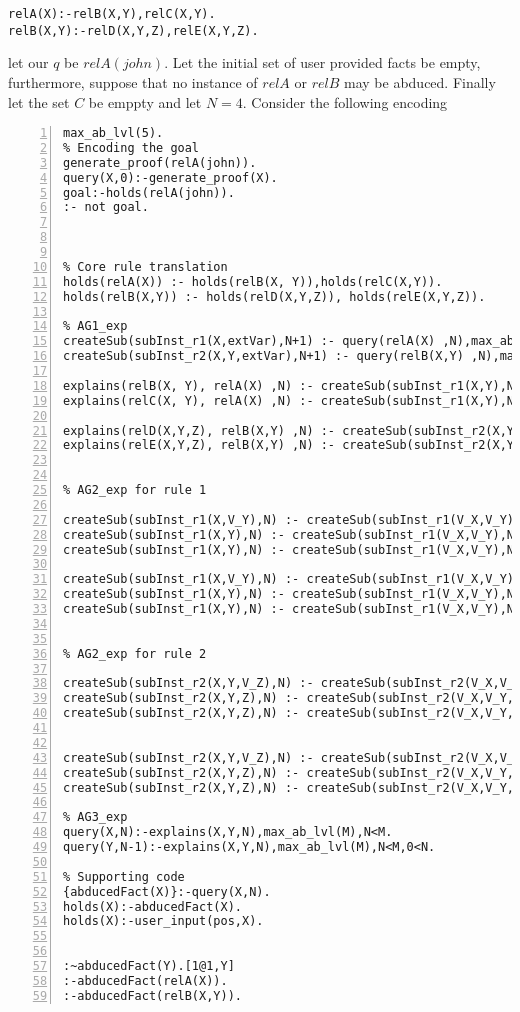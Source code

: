 \begin{lstlisting}[frame=none]
relA(X):-relB(X,Y),relC(X,Y).
relB(X,Y):-relD(X,Y,Z),relE(X,Y,Z).
\end{lstlisting}

let our $q$ be $relA(john)$. Let the initial set of user provided facts be empty, furthermore, suppose that no instance of $relA$ or $relB$ may be abduced. Finally let the set $C$ be emppty and let $N=4$.  
Consider the following encoding
\begin{lstlisting}[numbers=left]
max_ab_lvl(5).
% Encoding the goal
generate_proof(relA(john)).
query(X,0):-generate_proof(X).
goal:-holds(relA(john)).
:- not goal.



% Core rule translation
holds(relA(X)) :- holds(relB(X, Y)),holds(relC(X,Y)).
holds(relB(X,Y)) :- holds(relD(X,Y,Z)), holds(relE(X,Y,Z)).

% AG1_exp
createSub(subInst_r1(X,extVar),N+1) :- query(relA(X) ,N),max_ab_lvl(M),N<M-1.
createSub(subInst_r2(X,Y,extVar),N+1) :- query(relB(X,Y) ,N),max_ab_lvl(M),N<M-1.

explains(relB(X, Y), relA(X) ,N) :- createSub(subInst_r1(X,Y),N).
explains(relC(X, Y), relA(X) ,N) :- createSub(subInst_r1(X,Y),N).

explains(relD(X,Y,Z), relB(X,Y) ,N) :- createSub(subInst_r2(X,Y,Z),N).
explains(relE(X,Y,Z), relB(X,Y) ,N) :- createSub(subInst_r2(X,Y,Z),N).


% AG2_exp for rule 1

createSub(subInst_r1(X,V_Y),N) :- createSub(subInst_r1(V_X,V_Y),N), holds(relA(X)).
createSub(subInst_r1(X,Y),N) :- createSub(subInst_r1(V_X,V_Y),N), holds(relB(X,Y)).
createSub(subInst_r1(X,Y),N) :- createSub(subInst_r1(V_X,V_Y),N), holds(relC(X,Y)).

createSub(subInst_r1(X,V_Y),N) :- createSub(subInst_r1(V_X,V_Y),N), query(relA(X),L).
createSub(subInst_r1(X,Y),N) :- createSub(subInst_r1(V_X,V_Y),N), query(relB(X,Y),L).
createSub(subInst_r1(X,Y),N) :- createSub(subInst_r1(V_X,V_Y),N), query(relC(X,Y),L).


% AG2_exp for rule 2

createSub(subInst_r2(X,Y,V_Z),N) :- createSub(subInst_r2(V_X,V_Y,V_Z),N), holds(relB(X,Y)).
createSub(subInst_r2(X,Y,Z),N) :- createSub(subInst_r2(V_X,V_Y,V_Z),N), holds(relD(X,Y,Z)).
createSub(subInst_r2(X,Y,Z),N) :- createSub(subInst_r2(V_X,V_Y,V_Z),N), holds(relE(X,Y,Z)).


createSub(subInst_r2(X,Y,V_Z),N) :- createSub(subInst_r2(V_X,V_Y,V_Z),N), query(relB(X,Y),L).
createSub(subInst_r2(X,Y,Z),N) :- createSub(subInst_r2(V_X,V_Y,V_Z),N), query(relD(X,Y,Z),L).
createSub(subInst_r2(X,Y,Z),N) :- createSub(subInst_r2(V_X,V_Y,V_Z),N), query(relE(X,Y,Z),L).

% AG3_exp
query(X,N):-explains(X,Y,N),max_ab_lvl(M),N<M.
query(Y,N-1):-explains(X,Y,N),max_ab_lvl(M),N<M,0<N.

% Supporting code
{abducedFact(X)}:-query(X,N).
holds(X):-abducedFact(X).
holds(X):-user_input(pos,X).


:~abducedFact(Y).[1@1,Y]
:-abducedFact(relA(X)).
:-abducedFact(relB(X,Y)).

\end{lstlisting}

